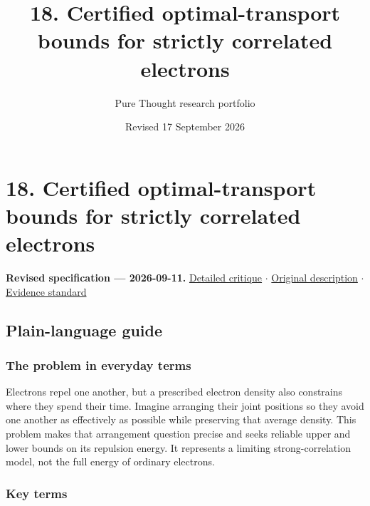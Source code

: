 \documentclass[
  11pt,
]{article}
\title{18. Certified optimal-transport bounds for strictly correlated
electrons}
\author{Pure Thought research portfolio}
\date{Revised 17 September 2026}
\begin{document}
\maketitle
\thispagestyle{empty}
\clearpage

\section{18. Certified optimal-transport bounds for strictly correlated
electrons}

\textbf{Revised specification --- 2026-09-11.}
\href{https://github.com/rick-stevens-ai/Pure-Thought/blob/main/reviews/18-Optimal-Transport-Chemistry.md}{Detailed
critique} \ensuremath{\cdot}
\href{https://github.com/rick-stevens-ai/Pure-Thought/blob/main/archive/original-PRDs/18-Optimal-Transport-Chemistry.md}{Original
description} \ensuremath{\cdot}
\href{https://github.com/rick-stevens-ai/Pure-Thought/blob/main/reviews/EVIDENCE-STANDARD.md}{Evidence
standard}

\subsection{Plain-language guide}

\subsubsection{The problem in everyday terms}

Electrons repel one another, but a prescribed electron density also
constrains where they spend their time. Imagine arranging their joint
positions so they avoid one another as effectively as possible while
preserving that average density. This problem makes that arrangement
question precise and seeks reliable upper and lower bounds on its
repulsion energy. It represents a limiting strong-correlation model, not
the full energy of ordinary electrons.

\subsubsection{Key terms}
\end{document}
